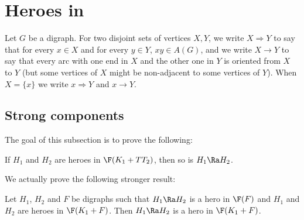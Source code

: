 







\section{Heroes in \omgs}

Let $G$ be a digraph.
For two disjoint sets of vertices $X, Y$, we write $X \Rightarrow Y$ to say that for every $x \in X$ and for every $y \in Y$, $xy \in A(G)$, and we write $X \rightarrow Y$ to say that every arc with one end in $X$ and the other one in $Y$ is oriented from $X$ to $Y$ (but some vertices of $X$ might be non-adjacent to some vertices of $Y$). When $X=\{x\}$ we write $x \Rightarrow Y$ and $x  \rightarrow Y$. 



\subsection{Strong components}\label{subsec:strong}

The goal of this subsection is to prove the following:

\begin{theorem}\label{thm:strong}
If $H_1$ and $H_2$ are heroes in $\F( K_1 + TT_2)$, then so is $H_1 \Ra H_2$. 
\end{theorem}

We actually prove the following stronger result:


\begin{theorem}\label{thm:strongg}
Let $H_1$, $H_2$ and $F$ be digraphs such that $H_1 \Ra H_2$ is a hero in $\F( F)$ and $H_1$ and $H_2$ are heroes in $\F( K_1 + F)$. Then $H_1 \Ra H_2$ is a hero in $\F( K_1 + F)$. 
\end{theorem}

